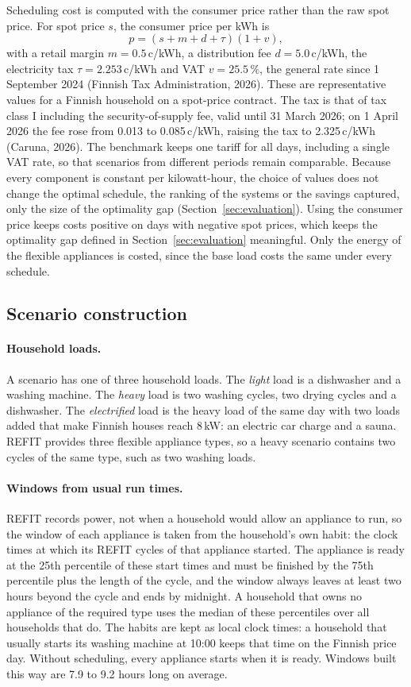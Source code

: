 \documentclass[12pt,a4paper]{report}
\begin{document}
Scheduling cost is computed with the consumer price rather than the raw
spot price. For spot price $s$, the consumer price per kWh is
\[
p = (s + m + d + \tau)(1 + v),
\]
with a retail margin $m = 0.5$\,c/kWh, a distribution fee $d =
5.0$\,c/kWh, the electricity tax $\tau = 2.253$\,c/kWh and VAT $v =
25.5\,\%$, the general rate since 1 September 2024 (Finnish Tax
Administration, 2026). These are representative values for a Finnish household on a
spot-price contract. The tax is that of tax class I including the
security-of-supply fee, valid until 31 March 2026; on 1 April 2026 the
fee rose from 0.013 to 0.085\,c/kWh, raising the tax to 2.325\,c/kWh
(Caruna, 2026). The benchmark keeps one tariff for all days, including a
single VAT rate, so that scenarios from different periods remain
comparable. Because every component is constant per kilowatt-hour, the
choice of values does not change the optimal schedule, the ranking of
the systems or the savings captured, only the size of the optimality gap
(Section~\ref{sec:evaluation}). Using the consumer
price keeps costs positive on days with negative spot prices, which
keeps the optimality gap defined in Section~\ref{sec:evaluation} meaningful. Only the
energy of the flexible appliances is costed, since the base load costs
the same under every schedule.

\subsection{Scenario construction}
\label{sec:construction}

\paragraph{Household loads.} A scenario has one of three household
loads. The \emph{light} load is a dishwasher and a washing machine. The
\emph{heavy} load is two washing cycles, two drying cycles and a
dishwasher. The \emph{electrified} load is the heavy load of the same
day with two loads added that make Finnish houses reach 8\,kW: an
electric car charge and a sauna. REFIT provides three flexible appliance
types, so a heavy scenario contains two cycles of the same type, such as
two washing loads.

\paragraph{Windows from usual run times.} REFIT records power, not when
a household would allow an appliance to run, so the window of each
appliance is taken from the household's own habit: the clock times at
which its REFIT cycles of that appliance started. The appliance is
ready at the 25th percentile of these start times and must be finished
by the 75th percentile plus the length of the cycle, and the window
always leaves at least two hours beyond the cycle and ends by midnight.
A household that owns no appliance of the required type uses the median
of these percentiles over all households that do. The habits are kept as
local clock times: a household that usually starts its washing machine
at 10:00 keeps that time on the Finnish price day. Without scheduling,
every appliance starts when it is ready. Windows built this way are
7.9 to 9.2 hours long on average.
\end{document}
